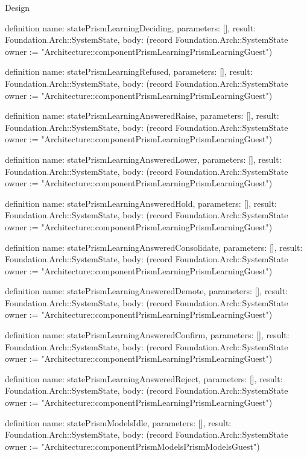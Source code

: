 \begin{lexlean}{Design}
\begin{semanticmodule}
definition{
  name: statePrismLearningDeciding,
  parameters: [],
  result: Foundation.Arch::SystemState,
  body: (record Foundation.Arch::SystemState {owner := "Architecture::componentPrismLearningPrismLearningGuest"})
}

definition{
  name: statePrismLearningRefused,
  parameters: [],
  result: Foundation.Arch::SystemState,
  body: (record Foundation.Arch::SystemState {owner := "Architecture::componentPrismLearningPrismLearningGuest"})
}

definition{
  name: statePrismLearningAnsweredRaise,
  parameters: [],
  result: Foundation.Arch::SystemState,
  body: (record Foundation.Arch::SystemState {owner := "Architecture::componentPrismLearningPrismLearningGuest"})
}

definition{
  name: statePrismLearningAnsweredLower,
  parameters: [],
  result: Foundation.Arch::SystemState,
  body: (record Foundation.Arch::SystemState {owner := "Architecture::componentPrismLearningPrismLearningGuest"})
}

definition{
  name: statePrismLearningAnsweredHold,
  parameters: [],
  result: Foundation.Arch::SystemState,
  body: (record Foundation.Arch::SystemState {owner := "Architecture::componentPrismLearningPrismLearningGuest"})
}

definition{
  name: statePrismLearningAnsweredConsolidate,
  parameters: [],
  result: Foundation.Arch::SystemState,
  body: (record Foundation.Arch::SystemState {owner := "Architecture::componentPrismLearningPrismLearningGuest"})
}

definition{
  name: statePrismLearningAnsweredDemote,
  parameters: [],
  result: Foundation.Arch::SystemState,
  body: (record Foundation.Arch::SystemState {owner := "Architecture::componentPrismLearningPrismLearningGuest"})
}

definition{
  name: statePrismLearningAnsweredConfirm,
  parameters: [],
  result: Foundation.Arch::SystemState,
  body: (record Foundation.Arch::SystemState {owner := "Architecture::componentPrismLearningPrismLearningGuest"})
}

definition{
  name: statePrismLearningAnsweredReject,
  parameters: [],
  result: Foundation.Arch::SystemState,
  body: (record Foundation.Arch::SystemState {owner := "Architecture::componentPrismLearningPrismLearningGuest"})
}

definition{
  name: statePrismModelsIdle,
  parameters: [],
  result: Foundation.Arch::SystemState,
  body: (record Foundation.Arch::SystemState {owner := "Architecture::componentPrismModelsPrismModelsGuest"})
}


\end{semanticmodule}
\end{lexlean}
